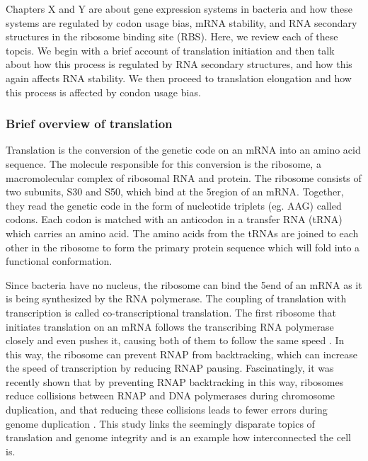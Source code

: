 %
Chapters X and Y are about gene expression systems in bacteria and how these
systems are regulated by codon usage bias, mRNA stability, and RNA secondary
structures in the ribosome binding site (RBS). Here, we review each of these
topcis. We begin with a brief account of translation initiation and then talk
about how this process is regulated by RNA secondary structures, and how this
again affects RNA stability. We then proceed to translation elongation and how
this process is affected by condon usage bias.

\subsubsection{Brief overview of translation}
Translation is the conversion of the genetic code on an mRNA into an amino acid
sequence. The molecule responsible for this conversion is the ribosome, a
macromolecular complex of ribosomal RNA and protein. The ribosome consists of
two subunits, S30 and S50, which bind at the 5\p region of an mRNA. Together,
they read the genetic code in the form of nucleotide triplets (eg. AAG) called
codons. Each codon is matched with an anticodon in a transfer RNA (tRNA) which
carries an amino acid. The amino acids from the tRNAs are joined to each other
in the ribosome to form the primary protein sequence which will fold into a
functional conformation.

Since bacteria have no nucleus, the ribosome can bind the 5\p end of an mRNA as
it is being synthesized by the RNA polymerase. The coupling of translation with
transcription is called co-transcriptional translation. The first ribosome that
initiates translation on an mRNA follows the transcribing RNA polymerase
closely and even pushes it, causing both of them to follow the same speed
\cite{proshkin_cooperation_2010}. In this way, the ribosome can prevent RNAP
from backtracking, which can increase the speed of transcription by reducing
RNAP pausing. Fascinatingly, it was recently shown that by preventing RNAP
backtracking in this way, ribosomes reduce collisions between RNAP and DNA
polymerases during chromosome duplication, and that reducing these
collisions leads to fewer errors during genome duplication
\cite{dutta_linking_2011}. This study links the seemingly disparate topics of
translation and genome integrity and is an example how interconnected the cell
is.

